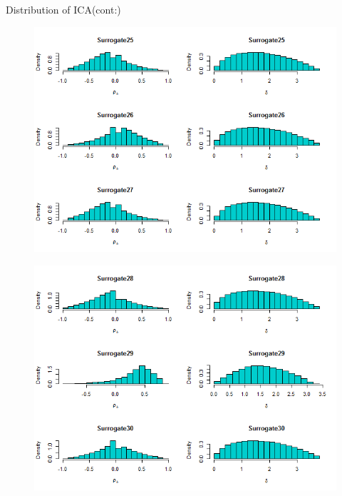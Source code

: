 \documentclass[a4paper,9pt]{beamer}\usepackage[]{graphicx}\usepackage[]{color}
\begin{document}
\begin{frame}{Distribution of ICA(cont:)}
\begin{minipage}{0.3\textwidth}
\begin{figure}[H]
\includegraphics[scale=0.32]{icaplots9.png}
\end{figure}
\end{minipage}
\hfill
\begin{minipage}{0.40\textwidth}
\begin{figure}[H]
\includegraphics[scale=0.32]{icaplots10.png}
\end{figure}
\end{minipage}
\end{frame}
\end{document}

